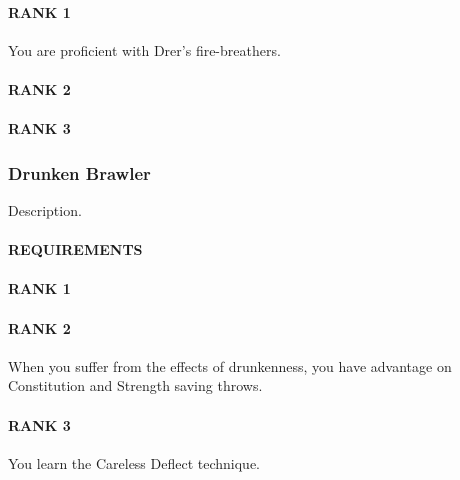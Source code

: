 \paragraph{RANK 1} You are proficient with Drer's fire-breathers.
\paragraph{RANK 2}
\paragraph{RANK 3}

\subsubsection{Drunken Brawler} \label{feat::drunkenbrawler} %
\small{\textcolor{gray}{}}

\normalsize
Description.
\paragraph{REQUIREMENTS}
\paragraph{RANK 1}
\paragraph{RANK 2} When you suffer from the effects of drunkenness, you have advantage on Constitution and Strength saving throws.
\paragraph{RANK 3} You learn the Careless Deflect technique.


